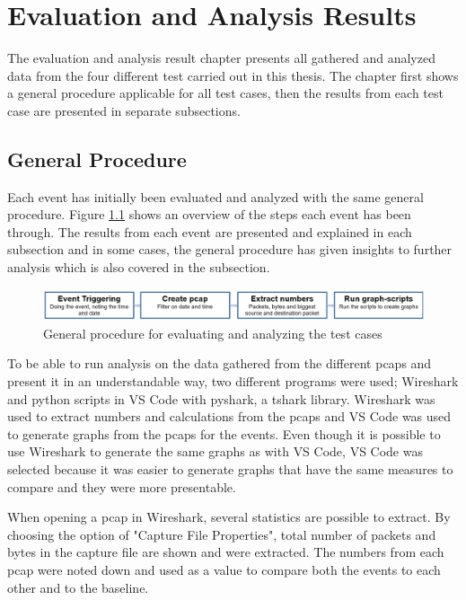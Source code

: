 \chapter{Evaluation and Analysis Results}
The evaluation and analysis result chapter presents all gathered and analyzed data from the four different test carried out in this thesis. The chapter first shows a general procedure applicable for all test cases, then the results from each test case are presented in separate subsections. 

\section{General Procedure}
Each event has initially been evaluated and analyzed with the same general procedure. Figure \ref{fig:GeneralProcedure} shows an overview of the steps each event has been through. The results from each event are presented and explained in each subsection and in some cases, the general procedure has given insights to further analysis which is also covered in the subsection.

\begin{figure}[H]
    \centering
    \includegraphics[width=\textwidth]{figures/GeneralProcedure.png}
    \caption{General procedure for evaluating and analyzing the test cases}
    \label{fig:GeneralProcedure}
\end{figure}

To be able to run analysis on the data gathered from the different \gls{pcaps} and present it in an understandable way, two different programs were used; Wireshark and python scripts in \gls{VS Code} with pyshark, a tshark library. Wireshark was used to extract numbers and calculations from the pcaps and \gls{VS Code} was used to generate graphs from the pcaps for the events. Even though it is possible to use Wireshark to generate the same graphs as with \gls{VS Code}, \gls{VS Code} was selected because it was easier to generate graphs that have the same measures to compare and they were more presentable.

When opening a pcap in Wireshark, several statistics are possible to extract. By choosing the option of "Capture File Properties", total number of packets and bytes in the capture file are shown and were extracted. The numbers from each pcap were noted down and used as a value to compare both the events to each other and to the baseline. 

